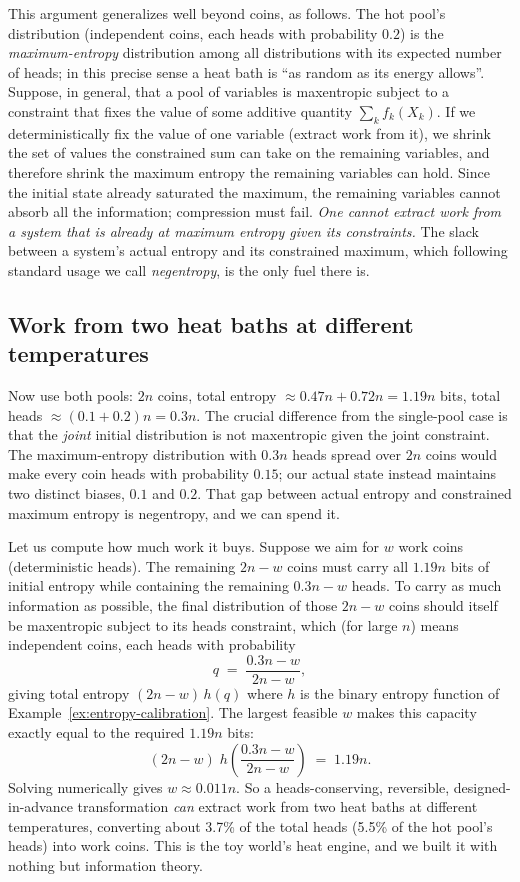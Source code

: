 \documentclass[10pt]{article}
\theoremstyle{definition}
\theoremstyle{remark}
\begin{document}
This argument generalizes well beyond coins, as follows. The hot pool's distribution (independent coins, each heads with probability $0.2$) is the \emph{maximum-entropy} distribution among all distributions with its expected number of heads; in this precise sense a heat bath is ``as random as its energy allows''. Suppose, in general, that a pool of variables is maxentropic subject to a constraint that fixes the value of some additive quantity $\sum_k f_k(X_k)$. If we deterministically fix the value of one variable (extract work from it), we shrink the set of values the constrained sum can take on the remaining variables, and therefore shrink the maximum entropy the remaining variables can hold. Since the initial state already saturated the maximum, the remaining variables cannot absorb all the information; compression must fail. \emph{One cannot extract work from a system that is already at maximum entropy given its constraints.} The slack between a system's actual entropy and its constrained maximum, which following standard usage we call \emph{negentropy}, is the only fuel there is.

\subsection{Work from two heat baths at different temperatures}
\label{sec:twobaths}

Now use both pools: $2n$ coins, total entropy $\approx 0.47n + 0.72n = 1.19n$ bits, total heads $\approx (0.1 + 0.2)n = 0.3n$. The crucial difference from the single-pool case is that the \emph{joint} initial distribution is not maxentropic given the joint constraint. The maximum-entropy distribution with $0.3n$ heads spread over $2n$ coins would make every coin heads with probability $0.15$; our actual state instead maintains two distinct biases, $0.1$ and $0.2$. That gap between actual entropy and constrained maximum entropy is negentropy, and we can spend it.

Let us compute how much work it buys. Suppose we aim for $w$ work coins (deterministic heads). The remaining $2n - w$ coins must carry all $1.19n$ bits of initial entropy while containing the remaining $0.3n - w$ heads. To carry as much information as possible, the final distribution of those $2n-w$ coins should itself be maxentropic subject to its heads constraint, which (for large $n$) means independent coins, each heads with probability
\[
q \;=\; \frac{0.3n - w}{2n - w},
\]
giving total entropy $(2n - w)\, h(q)$ where $h$ is the binary entropy function of Example~\ref{ex:entropy-calibration}. The largest feasible $w$ makes this capacity exactly equal to the required $1.19n$ bits:
\[
(2n - w)\; h\!\left(\frac{0.3n - w}{2n - w}\right) \;=\; 1.19n .
\]
Solving numerically gives $w \approx 0.011n$. So a heads-conserving, reversible, designed-in-advance transformation \emph{can} extract work from two heat baths at different temperatures, converting about 3.7\% of the total heads (5.5\% of the hot pool's heads) into work coins. This is the toy world's heat engine, and we built it with nothing but information theory.
\end{document}
